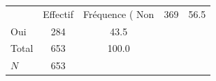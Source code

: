 {
\def\sym#1{\ifmmode^{#1}\else\(^{#1}\)\fi}
\begin{tabular}{l*{1}{cc}}
\toprule
            &    Effectif&Fréquence (%
\midrule
Non         &         369&        56.5\\
Oui         &         284&        43.5\\
Total       &         653&       100.0\\
\midrule
\(N\)       &         653&            \\
\bottomrule
\end{tabular}
}
